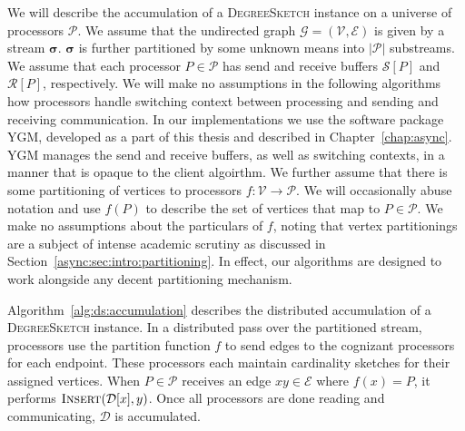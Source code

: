 \documentclass[10]{article}
\newcommand{\algoname}[1]{\textnormal{\textsc{#1}}}
\begin{document}
We will describe the accumulation of a \algoname{DegreeSketch} instance on a universe of processors $\mathcal{P}$. 
We assume that the undirected graph $\mathcal{G} = (\mathcal{V}, \mathcal{E})$ is given by a stream $\boldsymbol{\sigma}$.
$\boldsymbol{\sigma}$ is further partitioned by some unknown means into $|\mathcal{P}|$ substreams.
We assume that each processor $P \in \mathcal{P}$ has send and receive buffers $\mathcal{S}[P]$ and $\mathcal{R}[P]$, respectively.
We will make no assumptions in the following algorithms how processors handle switching context between processing and sending and receiving communication. 
In our implementations we use the software package \algoname{YGM}, developed as a part of this thesis and described in Chapter~\ref{chap:async}.
\algoname{YGM} manages the send and receive buffers, as well as switching contexts, in a manner that is opaque to the client algoirthm.
We further assume that there is some partitioning of vertices to processors $f : \mathcal{V} \rightarrow \mathcal{P}$. 
We will occasionally abuse notation and use $f(P)$ to describe the set of vertices that map to $P \in \mathcal{P}$.
We make no assumptions about the particulars of $f$, noting that vertex partitionings are a subject of intense academic scrutiny as discussed in Section~\ref{async:sec:intro:partitioning}.
In effect, our algorithms are designed to work alongside any decent partitioning mechanism. 

Algorithm~\ref{alg:ds:accumulation} describes the distributed accumulation of a \algoname{DegreeSketch} instance.
In a distributed pass over the partitioned stream, processors use the partition function $f$ to send edges to the cognizant processors for each endpoint. 
These processors each maintain cardinality sketches for their assigned vertices.
When $P \in \mathcal{P}$ receives an edge $xy \in \mathcal{E}$ where $f(x) = P$, it performs $\algoname{Insert}(\mathcal{D}[x], y)$.
Once all processors are done reading and communicating, $\mathcal{D}$ is accumulated.
\end{document}
